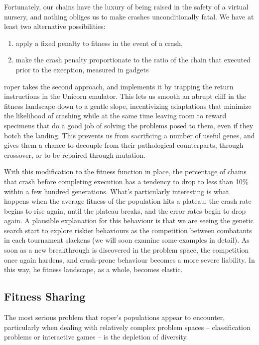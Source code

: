 \documentclass[12pt,glossary]{dalthesis}
\begin{document}
Fortunately, our chains have the luxury of being raised in the safety of a
virtual nursery, and nothing obliges us to make crashes unconditionally fatal.
We have at least two alternative possibilities:

\begin{enumerate}
\item apply a fixed penalty to fitness in the event of a crash,
\item make the crash penalty proportionate to the ratio of
the chain that executed prior to the exception, measured in gadgets
\end{enumerate}

\Gls{roper} takes the second approach, and implements it by
trapping the return instructions in the Unicorn emulator. This lets us smooth an
abrupt cliff in the fitness landscape down to a gentle slope, incentivizing
adaptations that minimize the likelihood of crashing while at the same time
leaving room to reward specimens that do a good job of solving the
problems posed to them, even if they botch the landing. This prevents us from
sacrificing a number of useful genes, and gives them a chance to decouple from
their pathological counterparts, through crossover, or to be repaired through
mutation.

With this modification to the fitness function in place, the percentage of
chains that crash before completing execution has a tendency to drop to less
than 10\% within a few hundred generations.  What's
particularly interesting is what happens when the average fitness of the
population hits a plateau: the crash rate begins to rise again, until the
plateau breaks, and the error rates begin to drop again. A plausible explanation
for this behaviour is that we are seeing the genetic search start to explore
riskier behaviours as the competition between combatants in each tournament
slackens (we will soon examine some examples in detail). As soon as a new
breakthrough is discovered in the problem space, the competition once again
hardens, and crash-prone behaviour becomes a more severe liability. In this way,
he fitness landscape, as a whole, becomes elastic.

\subsection{Fitness Sharing}
\label{sec:orgc4d1d61}
\label{orgc5218f5}

The most serious problem that \gls{roper}'s populations appear to encounter, particularly
when dealing with relatively complex problem spaces -- classification problems or
interactive games -- is the depletion of diversity. 
\end{document}
